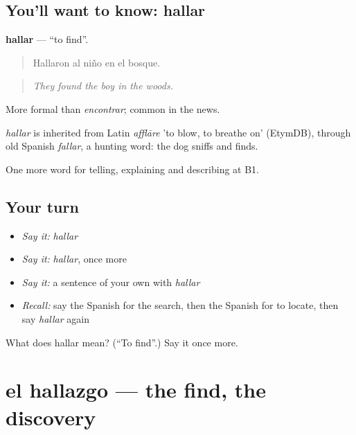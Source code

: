 \subsection*{You'll want to know: hallar}
\textbf{hallar} — \textquotedblleft{}to find\textquotedblright{}.

\begin{quote}
Hallaron al niño en el bosque.
\end{quote}

\begin{quote}
\emph{They found the boy in the woods.}
\end{quote}

More formal than \emph{encontrar}; common in the news.

\begin{cousinweb}
\emph{hallar} is inherited from Latin \emph{afflāre} 'to blow, to breathe on' (EtymDB), through old Spanish \emph{fallar}, a hunting word: the dog sniffs and finds.
\end{cousinweb}

\begin{grammarlens}[title={What you've built}]
One more word for telling, explaining and describing at B1.
\end{grammarlens}

\subsection*{Your turn}
\begin{itemize}
\raggedright
  \item \emph{Say it:} \emph{hallar}
  \item \emph{Say it:} \emph{hallar}, once more
  \item \emph{Say it:} a sentence of your own with \emph{hallar}
  \item \emph{Recall:} say the Spanish for the search, then the Spanish for to locate, then say \emph{hallar} again
\end{itemize}

\begin{tcolorbox}[breakable,colback=teal!4,colframe=teal!35!black,title={Before you move on}]
What does hallar mean? (\textquotedblleft{}To find\textquotedblright{}.) Say it once more.
\end{tcolorbox}
\section[el hallazgo]{el hallazgo — the find, the discovery}


